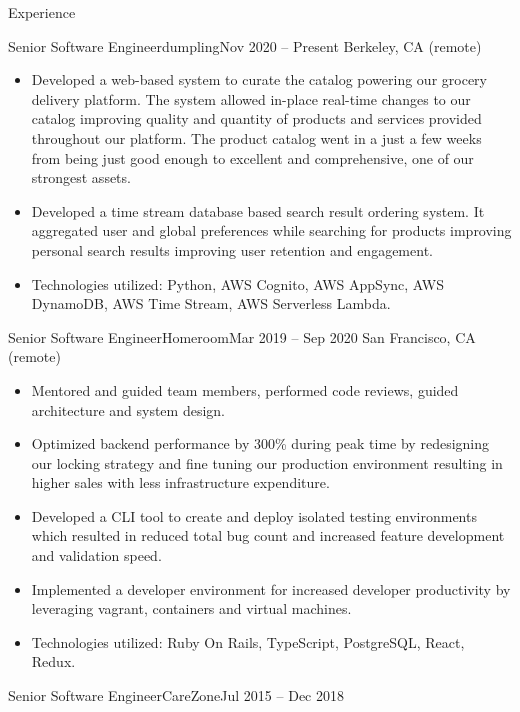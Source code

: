 \documentclass[calibri]{mcdowellcv}
\begin{document}
\makeheader

\begin{cvsection}{Experience}
	\vskip 0.2in
	\begin{cvsubsection}{Senior Software Engineer}{dumpling}{Nov 2020 -- Present}
		Berkeley, CA (remote)
		\begin{itemize}%
			\item Developed a web-based system to curate the catalog powering our grocery delivery platform. The system allowed in-place real-time changes to our catalog improving quality and quantity of products and services provided throughout our platform. The product catalog went in a just a few weeks from being just good enough to excellent and comprehensive, one of our strongest assets.
			\item Developed a time stream database based search result ordering system. It aggregated user and global preferences while searching for products improving personal search results improving user retention and engagement.
			\item Technologies utilized: Python, AWS Cognito, AWS AppSync, AWS DynamoDB, AWS Time Stream, AWS Serverless Lambda.
		\end{itemize}
	\end{cvsubsection}
	\vskip 0.3in
	\begin{cvsubsection}{Senior Software Engineer}{Homeroom}{Mar 2019 -- Sep 2020}
		San Francisco, CA (remote)
		\begin{itemize}%
			\item Mentored and guided team members, performed code reviews, guided architecture and system design.
			\item Optimized backend performance by 300\% during peak time by redesigning our locking strategy and fine tuning our production environment resulting in higher sales with less infrastructure expenditure.
			\item Developed a CLI tool to create and deploy isolated testing environments which resulted in reduced total bug count and increased feature development and validation speed.
			\item Implemented a developer environment for increased developer productivity by leveraging vagrant, containers and virtual machines.
			\item Technologies utilized: Ruby On Rails, TypeScript, PostgreSQL, React, Redux.
		\end{itemize}
	\end{cvsubsection}
	\vskip 0.3in
	\begin{cvsubsection}{Senior Software Engineer}{CareZone}{Jul 2015 -- Dec 2018}

\end{cvsubsection}
\end{cvsection}
\end{document}

